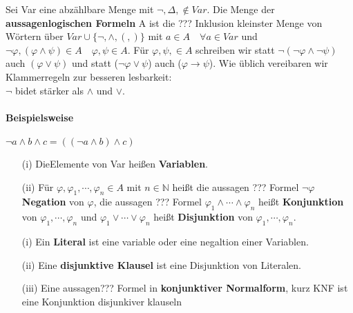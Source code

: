     Sei Var eine abzählbare Menge mit \(\lnot, \Delta, \not \in Var\). Die Menge der \textbf{aussagenlogischen Formeln} A ist die ??? Inklusion kleinster Menge von Wörtern über \(Var \cup \{\lnot, \wedge, (,)\}\) mit \(a \in A \quad \forall a \in Var\) und \(\lnot \varphi, (\varphi \wedge \psi) \in A \quad \varphi, \psi \in A\). Für \(\varphi, \psi, \in A\) schreiben wir statt \(\lnot(\lnot \varphi \wedge \lnot \psi)\) auch \((\varphi \vee \psi)\) und statt (\(\lnot \varphi \vee \psi\)) auch (\(\varphi \to \psi\)). Wie üblich vereibaren wir Klammerregeln zur besseren lesbarkeit: \\ \(\lnot\) bidet stärker als \(\wedge\) und \(\vee\). 
    \paragraph*{Beispielsweise}
        \(\lnot a \wedge b \wedge c = ((\lnot a \wedge b)\wedge c)\)
    
    \begin{itemize}
        \item [(i)]DieElemente von Var heißen \textbf{Variablen}.
        \item [(ii)] Für \(\varphi, \varphi_1, \cdots, \varphi_n \in A\) mit \(n \in \mathbb{N}\) heißt die aussagen ??? Formel \( \lnot \varphi\) \textbf{Negation} von \(\varphi\), die aussagen ??? Formel \(\varphi_1 \wedge \cdots \wedge \varphi_n\) heißt \textbf{Konjunktion} von \(\varphi_1, \cdots, \varphi_n\) und \(\varphi_1 \vee \cdots \vee \varphi_n\) heißt \textbf{Disjunktion} von \(\varphi_1, \cdots, \varphi_n\).
    \end{itemize}

\begin{itemize}
    \item [(i)] Ein \textbf{Literal} ist eine variable oder eine negaltion einer Variablen.
    \item [(ii)] Eine \textbf{disjunktive Klausel} ist eine Disjunktion von Literalen.
    \item [(iii)] Eine aussagen??? Formel in \textbf{konjunktiver Normalform}, kurz KNF ist eine Konjunktion disjunkiver klauseln
\end{itemize}

